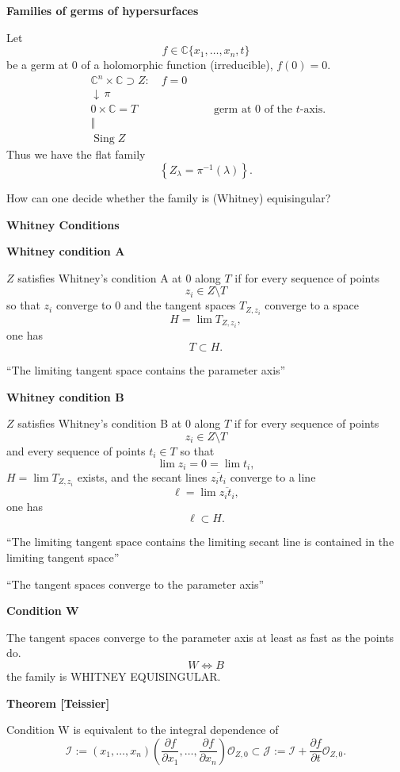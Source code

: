 \medskip\noindent
{\bf Families of germs of hypersurfaces}

Let
$$
f\in\mathbb{C}\{x_1,\ldots,x_n,t\}
$$
be a germ at $0$ of a holomorphic
function (irreducible), $f(0)=0$.
$$
\begin{array}{c}
\mathbb{C}^n\times\mathbb{C}
\supset Z:\quad f=0
\\
\downarrow\,\pi
\\
0\times\mathbb{C}=T
\\
\Vert
\\
\operatorname{Sing}Z
\end{array}
\qquad
\text{germ at $0$ of the $t$-axis}.
$$
Thus we have the flat family
$$
\left\{
Z_\lambda=\pi^{-1}(\lambda)
\right\}.
$$

How can one decide whether the family is
(Whitney) equisingular?

\medskip\noindent
{\bf Whitney Conditions}

\medskip\noindent
{\bf Whitney condition A}

$Z$ satisfies Whitney's condition A at
$0$ along $T$ if for every sequence of
points
$$
z_i\in Z\setminus T
$$
so that $z_i$ converge to $0$ and the
tangent spaces $T_{Z,z_i}$ converge to a
space
$$
H=\lim T_{Z,z_i},
$$
one has
$$
T\subset H.
$$

``The limiting tangent space contains the
parameter axis''

\medskip\noindent
{\bf Whitney condition B}

$Z$ satisfies Whitney's condition B at
$0$ along $T$ if for every sequence of
points
$$
z_i\in Z\setminus T
$$
and every sequence of points $t_i\in T$
so that
$$
\lim z_i=0=\lim t_i,
$$
$H=\lim T_{Z,z_i}$ exists, and the secant
lines $\overline{z_it_i}$ converge to a
line
$$
\ell=\lim\overline{z_it_i},
$$
one has
$$
\ell\subset H.
$$

``The limiting tangent space contains the
limiting secant line is contained in the
limiting tangent space''

\medskip\noindent
``The tangent spaces converge to the
parameter axis''

\medskip\noindent
{\bf Condition W}

The tangent spaces converge to the
parameter axis at least as fast as the
points do.
$$
W\Longleftrightarrow B
$$
the family is WHITNEY EQUISINGULAR.

\medskip\noindent
{\bf Theorem [Teissier]}

Condition W is equivalent to the integral
dependence of
$$
\mathcal{I}
:=
(x_1,\ldots,x_n)
\left(
\frac{\partial f}{\partial x_1},
\ldots,
\frac{\partial f}{\partial x_n}
\right)
\mathcal{O}_{Z,0}
\subset
\mathcal{J}
:=
\mathcal{I}
+
\frac{\partial f}{\partial t}
\mathcal{O}_{Z,0}.
$$

